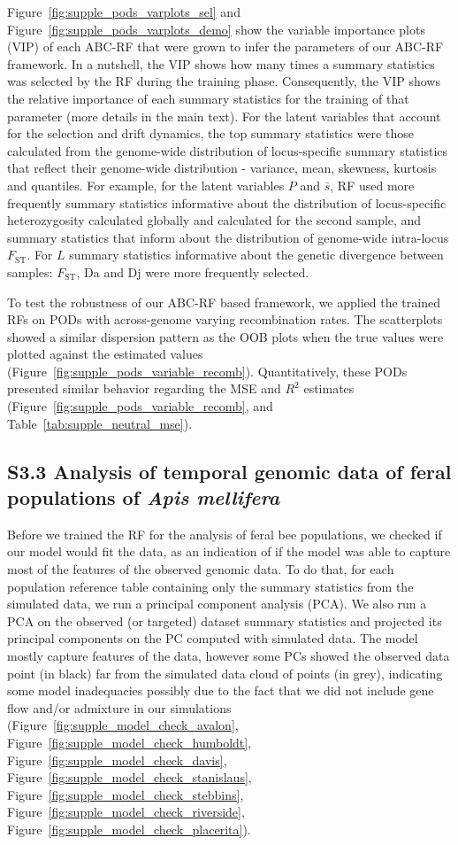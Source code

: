 \documentclass[a4paper, 12pt]{article}
\begin{document}
Figure~\ref{fig:supple_pods_varplots_sel} and Figure~\ref{fig:supple_pods_varplots_demo} show the variable importance plots (VIP) of each ABC-RF that were grown to infer the parameters of our ABC-RF framework. In a nutshell, the VIP shows how many times a summary statistics was selected by the RF during the training phase. Consequently, the VIP shows the relative importance of each summary statistics for the training of that parameter (more details in the main text). For the latent variables that account for the selection and drift dynamics, the top summary statistics were those calculated from the genome-wide distribution of locus-specific summary statistics that reflect their genome-wide distribution - variance, mean, skewness, kurtosis and quantiles. For example, for the latent variables $P$ and $\bar{s}$, RF used more frequently summary statistics informative about the distribution of locus-specific heterozygosity calculated globally and calculated for the second sample, and summary statistics that inform about the distribution of genome-wide intra-locus $F_{\mathrm{ST}}$. For $L$ summary statistics informative about the genetic divergence between samples: $F_{\mathrm{ST}}$, Da and Dj were more frequently selected. 

To test the robustness of our ABC-RF based framework, we applied the trained RFs on PODs with across-genome varying recombination rates. The scatterplots showed a similar dispersion pattern as the OOB plots when the true values were plotted against the estimated values (Figure~\ref{fig:supple_pods_variable_recomb}). Quantitatively, these PODs presented similar behavior regarding the MSE and $R^2$ estimates (Figure~\ref{fig:supple_pods_variable_recomb}, and Table~\ref{tab:supple_neutral_mse}).

\subsection*{S3.3 Analysis of temporal genomic data of feral populations of \textit{Apis mellifera}}

Before we trained the RF for the analysis of feral bee populations, we checked if our model would fit the data, as an indication of if the model was able to capture most of the features of the observed genomic data. To do that, for each population reference table containing only the summary statistics from the simulated data, we run a principal component analysis (PCA). We also run a PCA on the observed (or targeted) dataset summary statistics and projected its principal components on the PC computed with simulated data. The model mostly capture features of the data, however some PCs showed the observed data point (in black) far from the simulated data cloud of points (in grey), indicating some model inadequacies possibly due to the fact that we did not include gene flow and/or admixture in our simulations (Figure~\ref{fig:supple_model_check_avalon}, Figure~\ref{fig:supple_model_check_humboldt}, Figure~\ref{fig:supple_model_check_davis}, Figure~\ref{fig:supple_model_check_stanislaus}, Figure~\ref{fig:supple_model_check_stebbins}, Figure~\ref{fig:supple_model_check_riverside}, Figure~\ref{fig:supple_model_check_placerita}). 
\end{document}
